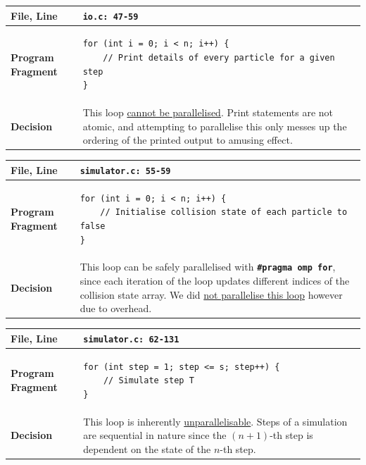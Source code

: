 \documentclass[12pt]{article}
\newcommand{\bt}[1]{\texttt{\textbf{#1}}}
\begin{document}
\begin{center}
\begin{tabular}{ | m{5em} | m{33em} | } 
\hline
\textbf{File, Line} & \bt{io.c: 47-59} \\ \hline
\textbf{Program Fragment} &
\begin{verbatim}
for (int i = 0; i < n; i++) {
    // Print details of every particle for a given step
}
\end{verbatim}
\\ \hline
\textbf{Decision} &
This loop \ul{cannot be parallelised}. Print statements are not atomic, and attempting to parallelise this only messes up the ordering of the printed output to amusing effect.
\\ \hline
\end{tabular}
\end{center}

\begin{center}
\begin{tabular}{ | m{5em} | m{33em} | } 
\hline
\textbf{File, Line} & \bt{simulator.c: 55-59} \\ \hline
\textbf{Program Fragment} &
\begin{verbatim}
for (int i = 0; i < n; i++) {
    // Initialise collision state of each particle to false
}
\end{verbatim}
\\ \hline
\textbf{Decision} &
This loop can be safely parallelised with \bt{\#pragma omp for}, since each iteration of the loop updates different indices of the collision state array. We did \ul{not parallelise this loop} however due to overhead.
\\ \hline
\end{tabular}
\end{center}

\begin{center}
\begin{tabular}{ | m{5em} | m{33em} | } 
\hline
\textbf{File, Line} & \bt{simulator.c: 62-131} \\ \hline
\textbf{Program Fragment} &
\begin{verbatim}
for (int step = 1; step <= s; step++) {
    // Simulate step T
}
\end{verbatim}
\\ \hline
\textbf{Decision} &
This loop is inherently \ul{unparallelisable}. Steps of a simulation are sequential in nature since the $(n+1)$-th step is dependent on the state of the $n$-th step.
\\ \hline
\end{tabular}
\end{center}
\end{document}
